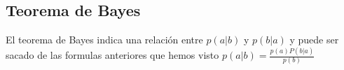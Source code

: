 \subsection{Teorema de Bayes}
El teorema de Bayes indica una relación entre $p(a|b)$ y $p(b|a)$ y puede ser sacado de las formulas anteriores que hemos visto $p(a|b)=\frac{p(a)P(b|a)}{p(b)}$
